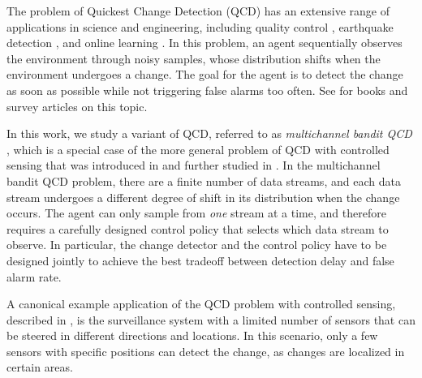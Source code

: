 \documentclass[letterpaper, 10 pt, conference]{ieeeconf}  %
\begin{document}
The problem of Quickest Change Detection (QCD) has an extensive range of applications in science and engineering, including quality control \cite{hawkins2003changepoint}, earthquake detection \cite{zhou2025sequential}, and online learning \cite{huang2025sequential}. In this problem, an agent sequentially observes the environment through noisy samples, whose distribution shifts when the environment undergoes a change. The goal for the agent is to detect the change as soon as possible while not triggering false alarms too often. See \cite{poor-hadj-qcd-book-2009, vvv_qcd_overview, tart-niki-bass-2014, xie_vvv_qcd_overview} for books and survey articles on this topic.


In this work, we study a variant of QCD, referred to as \emph{multichannel bandit QCD}  \cite{xu2021optimum,zhang2023bandit,xu2023asymptotic}, which is a special case of the more general problem of QCD with controlled sensing that was introduced in \cite{gopalan2021bandit} and further studied in \cite{veeravalli2024quickest}. In the multichannel bandit QCD problem, there are a finite number of data streams, and each data stream undergoes a different degree of shift in its distribution when the change occurs. The agent can only sample from \emph{one} stream at a time, and therefore requires a carefully designed control policy that selects which data stream to observe. In particular, the change detector and the control policy have to be designed jointly to achieve the best tradeoff between detection delay and false alarm rate. 

A canonical example application of the QCD problem with controlled sensing, described in \cite{gopalan2021bandit}, is the surveillance system with a limited number of sensors that can be steered in different directions and locations. In this scenario, only a few sensors with specific positions can detect the change, as changes are localized in certain areas. 
\end{document}
